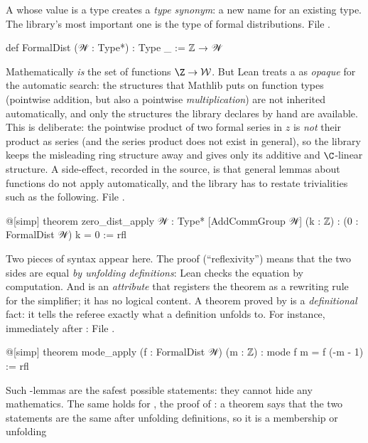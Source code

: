 A  whose value is a type creates a \emph{type synonym}: a new name for an existing type.
The library's most important one is the type of formal distributions.
\noindent File .
\begin{leancode}
def FormalDist (𝒲 : Type*) : Type _ := ℤ → 𝒲
\end{leancode}
Mathematically  \emph{is} the set of functions $\Z\to\mathcal W$. But Lean
treats a  as \emph{opaque} for the automatic search: the structures that Mathlib puts on
function types (pointwise addition, but also a pointwise \emph{multiplication}) are not inherited
automatically, and only the structures the library declares by hand are available. This is
deliberate: the pointwise product of two formal series in $z$ is \emph{not} their product as series
(and the series product does not exist in general), so the library keeps the misleading ring
structure away and gives  only its additive and $\C$-linear structure. A
side-effect, recorded in the source, is that general lemmas about functions do not apply
automatically, and the library has to restate trivialities such as the following.
\noindent File .
\begin{leancode}
@[simp] theorem zero_dist_apply {𝒲 : Type*} [AddCommGroup 𝒲] (k : ℤ) :
    (0 : FormalDist 𝒲) k = 0 := rfl
\end{leancode}
Two pieces of syntax appear here. The proof  (``reflexivity'') means that the two sides
are equal \emph{by unfolding definitions}: Lean checks the equation by computation. And
 is an \emph{attribute} that registers the theorem as a rewriting rule for the
simplifier; it has no logical content. A theorem proved by  is a \emph{definitional}
fact: it tells the referee exactly what a definition unfolds to. For instance, immediately after
:
\noindent File .
\begin{leancode}
@[simp] theorem mode_apply (f : FormalDist 𝒲) (m : ℤ) : mode f m = f (-m - 1) := rfl
\end{leancode}
Such -lemmas are the safest possible statements: they cannot hide any mathematics. The
same holds for , the proof of : a theorem  says that
the two statements are the same after unfolding definitions, so it is a membership or unfolding
